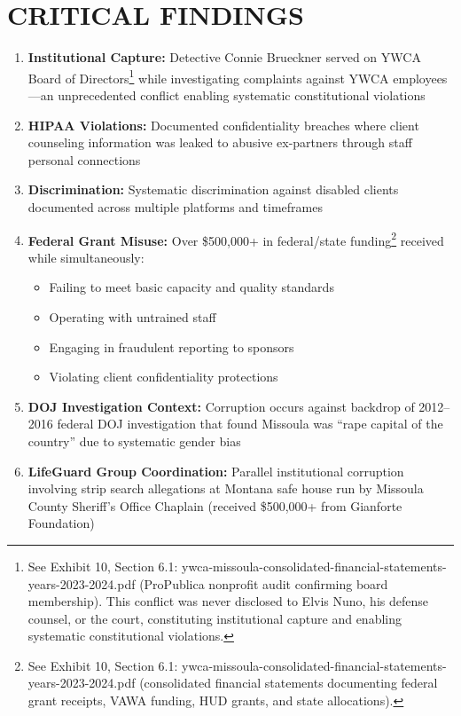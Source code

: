 \documentclass[12pt,oneside]{article}
\begin{document}
\section*{CRITICAL FINDINGS}

\begin{enumerate}
\item \textbf{Institutional Capture:} Detective Connie Brueckner served on YWCA Board of Directors\footnote{See Exhibit 10, Section 6.1: ywca-missoula-consolidated-financial-statements-years-2023-2024.pdf (ProPublica nonprofit audit confirming board membership). This conflict was never disclosed to Elvis Nuno, his defense counsel, or the court, constituting institutional capture and enabling systematic constitutional violations.} while investigating complaints against YWCA employees---an unprecedented conflict enabling systematic constitutional violations

\item \textbf{HIPAA Violations:} Documented confidentiality breaches where client counseling information was leaked to abusive ex-partners through staff personal connections

\item \textbf{Discrimination:} Systematic discrimination against disabled clients documented across multiple platforms and timeframes

\item \textbf{Federal Grant Misuse:} Over \$500,000+ in federal/state funding\footnote{See Exhibit 10, Section 6.1: ywca-missoula-consolidated-financial-statements-years-2023-2024.pdf (consolidated financial statements documenting federal grant receipts, VAWA funding, HUD grants, and state allocations).} received while simultaneously:
  \begin{itemize}
  \item Failing to meet basic capacity and quality standards
  \item Operating with untrained staff
  \item Engaging in fraudulent reporting to sponsors
  \item Violating client confidentiality protections
  \end{itemize}

\item \textbf{DOJ Investigation Context:} Corruption occurs against backdrop of 2012--2016 federal DOJ investigation that found Missoula was ``rape capital of the country'' due to systematic gender bias

\item \textbf{LifeGuard Group Coordination:} Parallel institutional corruption involving strip search allegations at Montana safe house run by Missoula County Sheriff's Office Chaplain (received \$500,000+ from Gianforte Foundation)
\end{enumerate}
\end{document}
